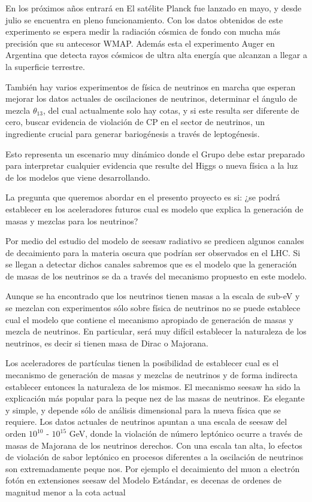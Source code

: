\begin{ideas}
En los próximos años entrará en El satélite Planck fue lanzado en mayo, y desde julio  se encuentra en pleno funcionamiento. Con los datos obtenidos de este experimento se espera medir la radiación cósmica de fondo con mucha más precisión que su antecesor WMAP. Además esta el experimento Auger en Argentina que detecta rayos cósmicos de ultra alta energía que alcanzan a llegar a la superficie terrestre. 

También hay varios experimentos de física de neutrinos en marcha que esperan mejorar los datos actuales de oscilaciones de neutrinos, determinar el ángulo de mezcla $\theta_{13}$, del cual actualmente solo hay cotas, y si este resulta ser diferente de cero, buscar evidencia de violación de CP en el sector de neutrinos, un ingrediente crucial para generar bariogénesis a través de leptogénesis.

Esto representa un escenario muy dinámico donde el Grupo debe estar preparado para interpretar cualquier evidencia que resulte del Higgs o nueva física a la luz de los modelos que viene desarrollando. 
	
La pregunta que queremos abordar en el presento proyecto es si: 
¿se podrá establecer en los aceleradores futuros cual es modelo que
explica la generación de masas y mezclas para los neutrinos?

Por medio del estudio del modelo de seesaw radiativo se predicen algunos canales de decaimiento para la materia oscura que podrían ser observados en el LHC. Si se llegan a detectar dichos canales sabremos que es el modelo que la generación de masas de los neutrinos se da a través del mecanismo propuesto en este modelo.

Aunque se ha encontrado que los neutrinos tienen masas a la escala de
sub-eV y se mezclan %
con experimentos sólo sobre
física de neutrinos no se puede establece cual el modelo que contiene
el mecanismo apropiado de generación de masas y mezcla de neutrinos.
En particular, será muy difícil establecer la naturaleza de los
neutrinos, es decir si tienen masa de Dirac o Majorana.

Los aceleradores de partículas tienen la posibilidad de
establecer cual es el mecanismo de generación de masas y mezclas de
neutrinos y de forma indirecta establecer entonces la naturaleza de
los mismos. El mecanismo seesaw %
ha sido la
explicación más popular para la peque nez de las masas de neutrinos. Es
elegante y simple, y depende sólo de análisis dimensional para la
nueva física que se requiere. Los datos actuales de neutrinos
apuntan a una escala de seesaw del orden $10^{10}$ - $10^{15}$ GeV,
donde la violación de número leptónico ocurre a través de masas de
Majorana de los neutrinos derechos. Con una escala tan alta, lo
efectos de violación de sabor leptónico en procesos diferentes a la
oscilación de neutrinos son extremadamente peque nos. Por ejemplo el
decaimiento del muon a electrón fotón en extensiones seesaw del Modelo
Estándar, es decenas de ordenes de magnitud menor a la cota actual


\end{ideas}
